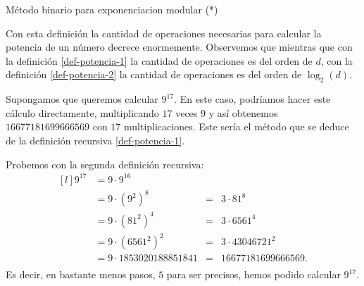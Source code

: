 \begin{section}{Método binario para exponenciacion modular (*)}
    
    Con esta definición la cantidad de operaciones necesarias para calcular la potencia de un número decrece enormemente. Observemos que mientras que con la definición \eqref{def-potencia-1} la cantidad  de operaciones es del orden de $d$,  con la definición \eqref{def-potencia-2} la cantidad de operaciones es del orden de $\log_2(d)$. 
    
    
\begin{ejemplo}\label{ejemplo-9**17}
    Supongamos que queremos calcular $9^{17}$.  En  este caso, podríamos hacer este cálculo  directamente, multiplicando $17$ veces $9$ y así obtenemos $16677181699666569$ con $17$ multiplicaciones. Este sería el método que se deduce de la definición recursiva \eqref{def-potencia-1}. 

    Probemos con la segunda definición recursiva:
    \begin{equation}\label{eq-9**17}
        \begin{matrix*}[l]
            9^{17}  &=  9 \cdot 9^{16}& & \\
                    &=  9 \cdot (9^{2})^8   &=& 3 \cdot 81^8 \\
                    &=  9 \cdot (81^2)^4 &=&  3 \cdot 6561^4  \\
                    &=  9 \cdot (6561^2)^2 &=&  3 \cdot 43046721^2\\
                    &=  9 \cdot 1853020188851841 &=&  16677181699666569.\\
        \end{matrix*}
    \end{equation}
Es decir,  en bastante menos pasos, $5$ para ser precisos,  hemos podido calcular $9^{17}$.
\end{ejemplo}


\end{section}
